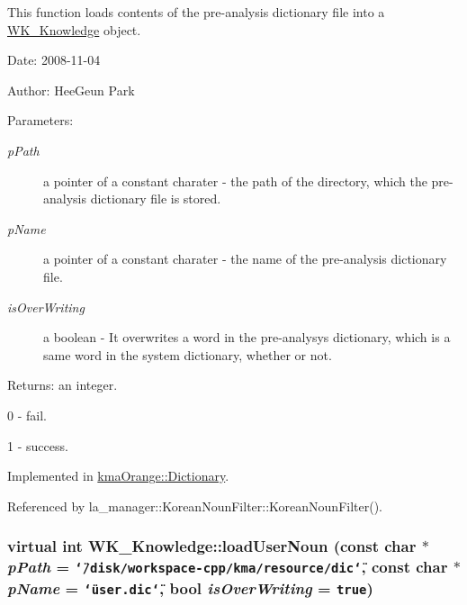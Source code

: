 This function loads contents of the pre-analysis dictionary file into a \hyperlink{classWK__Knowledge}{WK\_\-Knowledge} object. 

\begin{Desc}
\item[Date:]2008-11-04 \end{Desc}
\begin{Desc}
\item[Author:]HeeGeun Park \end{Desc}
\begin{Desc}
\item[Parameters:]
\begin{description}
\item[{\em pPath}]a pointer of a constant charater - the path of the directory, which the pre-analysis dictionary file is stored. \item[{\em pName}]a pointer of a constant charater - the name of the pre-analysis dictionary file. \item[{\em isOverWriting}]a boolean - It overwrites a word in the pre-analysys dictionary, which is a same word in the system dictionary, whether or not. \end{description}
\end{Desc}
\begin{Desc}
\item[Returns:]an integer.\par
 0 - fail.\par
 1 - success. \end{Desc}


Implemented in \hyperlink{classkmaOrange_1_1Dictionary_8a78b756e3a98be8ded1f5a38b5bd4ae}{kmaOrange::Dictionary}.

Referenced by la\_\-manager::KoreanNounFilter::KoreanNounFilter().\hypertarget{classWK__Knowledge_08574e4818e76b18fb58c4b4eec1d6aa}{
\subsubsection[{loadUserNoun}]{\setlength{\rightskip}{0pt plus 5cm}virtual int WK\_\-Knowledge::loadUserNoun (const char $\ast$ {\em pPath} = {\tt \char`\"{}/disk/workspace-cpp/kma/resource/dic\char`\"{}}, \/  const char $\ast$ {\em pName} = {\tt \char`\"{}user.dic\char`\"{}}, \/  bool {\em isOverWriting} = {\tt true})}}
\label{classWK__Knowledge_08574e4818e76b18fb58c4b4eec1d6aa}


